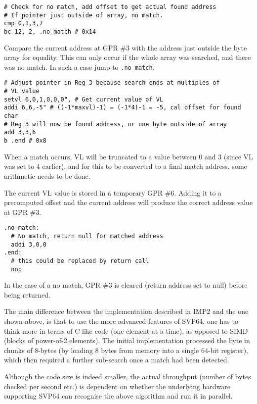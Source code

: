 \begin{verbatim}
# Check for no match, add offset to get actual found address
# If pointer just outside of array, no match.
cmp 0,1,3,7
bc 12, 2, .no_match # 0x14
\end{verbatim}

Compare the current address at \acrshort{GPR} \#3 with the address just outside
the byte array for equality. This can only occur if the whole array was
searched, and there was no match. In such a case jump to \texttt{.no\_match}.

\begin{verbatim}
# Adjust pointer in Reg 3 because search ends at multiples of
# VL value
setvl 6,0,1,0,0,0", # Get current value of VL
addi 6,6,-5" # ((-1*maxvl)-1) = (-1*4)-1 = -5, cal offset for found char
# Reg 3 will now be found address, or one byte outside of array
add 3,3,6
b .end # 0x8
\end{verbatim}

When a match occurs, \acrshort{VL} will be truncated to a value between 0 and 3
(since \acrshort{VL} was set to 4 earlier), and for this to be converted to a
final match address, some arithmetic needs to be done.

The current \acrshort{VL} value is stored in a temporary \acrshort{GPR} \#6. Adding it to a
precomputed offset and the current address will produce the correct address
value at \acrshort{GPR} \#3.

\begin{verbatim}
.no_match:
  # No match, return null for matched address
  addi 3,0,0
.end:
  # this could be replaced by return call
  nop
\end{verbatim}

In the case of a no match, \acrshort{GPR} \#3 is cleared (return address set to null)
before being returned.

The main difference between the implementation described in \acrshort{IMP}2
and the one shown above, is that to use the more advanced features of
\acrshort{SVP64}, one has to think more in terms of C-like code (one element at a time),
as opposed to \acrshort{SIMD} (blocks of power-of-2 elements). The initial
implementation processed the byte in chunks of 8-bytes (by loading 8 bytes
from memory into a single 64-bit register), which then required a further
sub-search once a match had been detected.

Although the code size is indeed smaller, the actual throughput (number of
bytes checked per second etc.) is dependent on whether the underlying hardware
supporting \acrshort{SVP64} can recognise the above algorithm and run it in parallel.
